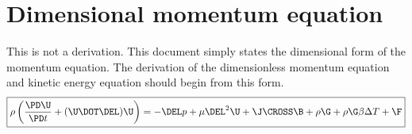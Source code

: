 \documentclass[11pt]{article}
\begin{document}
\doublespacing
\MOONSTITLE
\maketitle

\section{Dimensional momentum equation}
This is not a derivation. This document simply states the dimensional form of the momentum equation. The derivation of the dimensionless momentum equation and kinetic energy equation should begin from this form.
\begin{equation}
	\boxed{
	\rho \left( \frac{\PD \U}{\PD t} + (\U \DOT \DEL) \U \right) =
	-\DEL p + \mu \DEL^2 \U + \J \CROSS \B + \rho \G + \rho \G \beta \Delta T + \F
	}
\end{equation}
\end{document}
